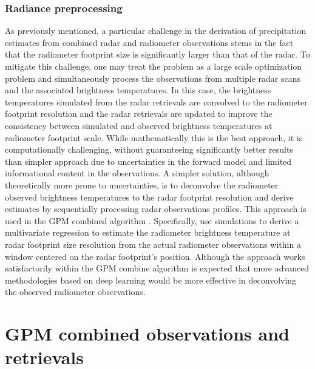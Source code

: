 \documentclass[10pt]{ietbook}
\begin{document}
\subsubsection{Radiance preprocessing}
As previously mentioned, a particular challenge in the derivation of precipitation estimates from combined radar and radiometer observations stems
in the fact that the radiometer footprint size is significantly larger than that of the radar. To mitigate this challenge, one may 
treat the problem as a large scale optimization problem and simultaneously process the observations from multiple radar scans and the associated
brightness temperatures.  In this case, the brightness temperatures simulated from the radar retrievals are convolved to the radiometer footprint 
resolution and the radar retrievals are updated to improve the consistency between simulated and observed brightness temperatures at radiometer footprint scale.
While mathematically this is the best approach, it is computationally challenging, without guaranteeing significantly better results than simpler
approach due to uncertainties in the forward model and limited informational content in the observations.  A simpler solution, although theoretically
more prone to uncertainties, is to deconvolve the radiometer observed brightness temperatures to the radar footprint resolution and derive estimates
by sequentially processing radar observations profiles. This approach is used in the GPM combined algorithm \cite{grecu2016}. Specifically, \cite{grecu2016}
use simulations to derive a multivariate regression to estimate the radiometer brightness temperature at radar footprint size resolution from the 
actual radiometer observations within a window centered on the radar footprint's position.  Although the approach works satisfactorily within the GPM
combine algorithm is expected that more advanced methodologies based on deep learning  \cite{yang2019} would be more effective in deconvolving the
observed radiometer observations.

\section{GPM combined observations and retrievals}
\end{document}
